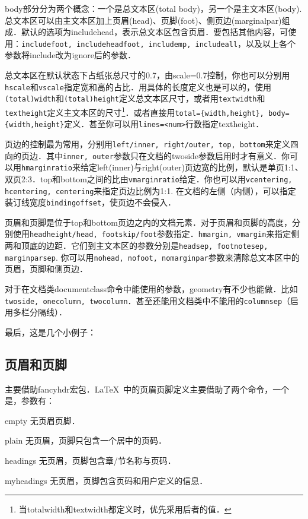 body部分分为两个概念：一个是总文本区(total body)，另一个是主文本区(body). 总文本区可以由主文本区加上页眉(head)、页脚(foot)、侧页边(marginalpar)组成．默认的选项为includehead，表示总文本区包含页眉．要包括其他内容，可使用：\texttt{includefoot, includeheadfoot, includemp, includeall}，以及以上各个参数将include改为ignore后的参数．

总文本区在默认状态下占纸张总尺寸的0.7，由scale=0.7控制，你也可以分别用\texttt{hscale}和\texttt{vscale}指定宽和高的占比．用具体的长度定义也是可以的，使用\texttt{(total)width}和\texttt{(total)height}定义总文本区尺寸，或者用\texttt{textwidth}和\texttt{textheight}定义主文本区的尺寸\footnote{当totalwidth和textwidth都定义时，优先采用后者的值．}．或者直接用\texttt{total=\{width,height\}, body=\{width,height\}}定义．甚至你可以用\texttt{lines=<num>}行数指定textheight．

页边的控制最为常用，分别用\texttt{left/inner, right/outer, top, bottom}来定义四向的页边．其中\texttt{inner, outer}参数只在文档的twoside参数启用时才有意义．你可以用\texttt{hmarginratio}来给定left(inner)与right(outer)页边宽的比例，默认是单页1:1、双页2:3．top和bottom之间的比由\texttt{vmarginratio}给定．你也可以用\texttt{vcentering, hcentering, centering}来指定页边比例为1:1. 在文档的左侧（内侧），可以指定装订线宽度\texttt{bindingoffset}，使页边不会侵入．

页眉和页脚是位于top和bottom页边之内的文档元素．对于页眉和页脚的高度，分别使用\texttt{headheight/head, footskip/foot}参数指定．\texttt{hmargin, vmargin}来指定侧两和顶底的边距．它们到主文本区的参数分别是\texttt{headsep, footnotesep, marginparsep}. 你可以用\texttt{nohead, nofoot, nomarginpar}参数来清除总文本区中的页眉，页脚和侧页边．

对于在文档类documentclass命令中能使用的参数，geometry有不少也能做．比如\texttt{twoside, onecolumn, twocolumn}．甚至还能用文档类中不能用的\texttt{columnsep}（启用多栏分隔线）．

最后，这是几个小例子：
\begin{latex}
\usepackage[hmargin=1.25in,vmargin=1in]{geometry}
\usepackage[inner=1in,outer=1.25in]{geometry}
\end{latex}

\subsection{页眉和页脚}
主要借助fancyhdr宏包．\LaTeX\ 中的页眉页脚定义主要借助了两个命令，一个是，参数有：
\begin{para}
\item[empty] 无页眉页脚．
\item[plain] 无页眉，页脚只包含一个居中的页码．
\item[headings] 无页眉，页脚包含章/节名称与页码．
\item[myheadings] 无页眉，页脚包含页码和用户定义的信息．
\end{para}

